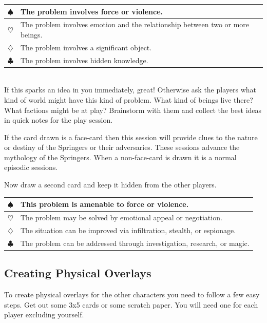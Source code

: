 \documentclass[letterpaper,12pt,landscape,twocolumn]{book}
\begin{document}
\begin{tabularx}{0.45\textwidth}{p{1cm}|X}
  \textbf{$\spadesuit$} & The problem involves force or
  violence. \\ \hline
  \textbf{$\heartsuit$} & The problem involves emotion and the
  relationship between two or more beings. \\ \hline
  \textbf{$\diamondsuit$} & The problem involves a significant
  object. \\ \hline
  \textbf{$\clubsuit$} & The problem involves hidden knowledge. \\ %
\end{tabularx}
\\
If this sparks an idea in you immediately, great! Otherwise ask the
players what kind of world might have this kind of problem. What kind
of beings live there? What factions might be at play? Brainstorm
with them and collect the best ideas in quick notes for the play
session. 

If the card drawn is a face-card then this session will provide clues
to the nature or destiny of the Springers or their adversaries. These
sessions advance the mythology of the Springers. When a
non-face-card is drawn it is a normal episodic sessions. 

Now draw a second card and keep it hidden from the other players. 

\begin{tabularx}{0.45\textwidth}{p{1cm}|X}
  \textbf{$\spadesuit$} & This problem is amenable to force or violence. \\ \hline
  \textbf{$\heartsuit$} & The problem may be solved by emotional
  appeal or negotiation. \\ \hline
  \textbf{$\diamondsuit$} & The situation can be improved via
  infiltration, stealth, or espionage. \\ \hline
  \textbf{$\clubsuit$} & The problem can be addressed through
  investigation, research, or magic. \\ %
\end{tabularx}

\subsection{Creating Physical Overlays}

To create physical overlays for the other characters you need to
follow a few easy steps. Get out some 3x5 cards or some scratch
paper. You will need one for each player excluding yourself. 
\end{document}
